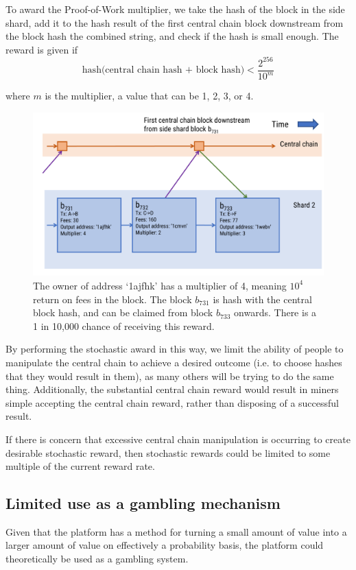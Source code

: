 \documentclass[a4paper,12pt]{article}
\begin{document}
To award the Proof-of-Work multiplier, we take the hash of the block in the side shard, add it to the hash result of the first central chain block downstream from the block hash the combined string, and check if the hash is small enough. The reward is given if
\[\text{hash(central chain hash + block hash)} < \frac{2^{256}}{10^m} \]

where $m$ is the multiplier, a value that can be 1, 2, 3, or 4.

\begin{figure}[!htb]
  \centering
  \includegraphics[page=1,width=.95\textwidth]{stochastic-reward} 
  \caption{The owner of address `1ajfhk' has a multiplier of 4, meaning $10^4$ return on fees in the block. The block $b_731$ is hash with the central block hash, and can be claimed from block $b_733$ onwards. There is a 1 in 10,000 chance of receiving this reward.}
  \label{fig:stochastic-reward}
\end{figure}
\FloatBarrier

By performing the stochastic award in this way, we limit the ability of people to manipulate the central chain to achieve a desired outcome (i.e. to choose hashes that they would result in them), as many others will be trying to do the same thing. Additionally, the substantial central chain reward would result in miners simple accepting the central chain reward, rather than disposing of a successful result. 

If there is concern that excessive central chain manipulation is occurring to create desirable stochastic reward, then stochastic rewards could be limited to some multiple of the current reward rate. 

\subsection{Limited use as a gambling mechanism}
Given that the platform has a method for turning a small amount of value into a larger amount of value on effectively a probability basis, the platform could theoretically be used as a gambling system.
\end{document}
